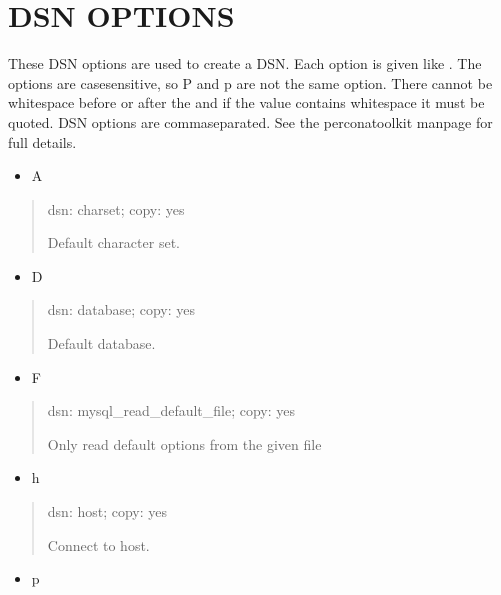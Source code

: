 \documentclass[letterpaper,10pt,english]{sphinxmanual}
\begin{document}
\section{DSN OPTIONS}
\label{\detokenize{mariadb-kill:dsn-options}}
These DSN options are used to create a DSN.  Each option is given like
.  The options are case\sphinxhyphen{}sensitive, so P and p are not the
same option.  There cannot be whitespace before or after the \sphinxcode{\sphinxupquote{=}} and
if the value contains whitespace it must be quoted.  DSN options are
comma\sphinxhyphen{}separated.  See the percona\sphinxhyphen{}toolkit manpage for full details.
\begin{itemize}
\item {} 
A

\end{itemize}
\begin{quote}

dsn: charset; copy: yes

Default character set.
\end{quote}
\begin{itemize}
\item {} 
D

\end{itemize}
\begin{quote}

dsn: database; copy: yes

Default database.
\end{quote}
\begin{itemize}
\item {} 
F

\end{itemize}
\begin{quote}

dsn: mysql\_read\_default\_file; copy: yes

Only read default options from the given file
\end{quote}
\begin{itemize}
\item {} 
h

\end{itemize}
\begin{quote}

dsn: host; copy: yes

Connect to host.
\end{quote}
\begin{itemize}
\item {} 
p

\end{itemize}
\end{document}
